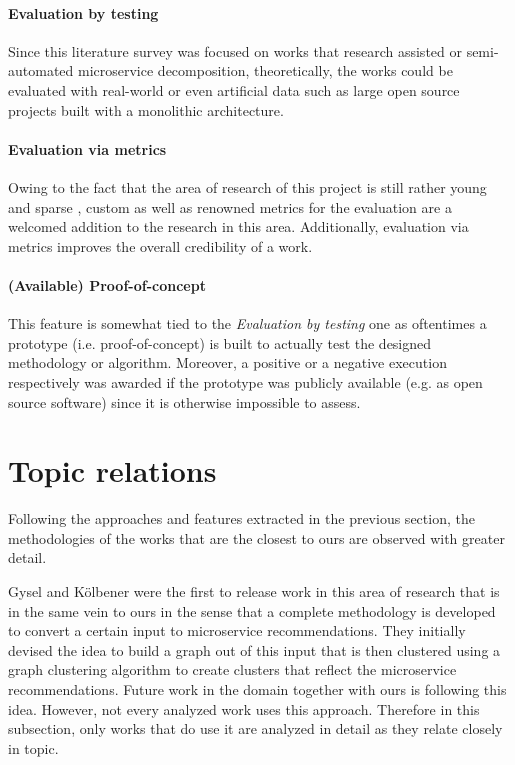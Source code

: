 \documentclass[12pt,a4paper]{report}
\begin{document}
\paragraph{Evaluation by testing}
Since this literature survey was focused on works that research assisted or semi-automated
microservice decomposition, theoretically, the works could be evaluated with real-world or
even artificial data such as large open source projects built with a monolithic architecture.
\paragraph{Evaluation via metrics}
Owing to the fact that the area of research of this project is still rather young and sparse
\cite{jin2018functionality}\cite{fritzsch2018monolith}, custom as well as renowned metrics
for the evaluation are a welcomed addition to the research in this area.
Additionally, evaluation via metrics improves the overall credibility of a work.
\paragraph{(Available) Proof-of-concept}
This feature is somewhat tied to the \textit{Evaluation by testing} one as oftentimes
a prototype (i.e. proof-of-concept) is built to actually test the designed
methodology or algorithm. Moreover, a positive or a negative execution respectively
was awarded if the prototype was publicly available (e.g. as open source software)
since it is otherwise impossible to assess.



\section{Topic relations} \label{subsect:topic-relations}

Following the approaches and features extracted in the previous section,
the methodologies of the works that are the closest to ours are observed with greater detail.

Gysel and K{\"o}lbener \cite{gysel2016service} were the first to release work in
this area of research that is in the same vein to ours in the sense that a
complete methodology is developed to convert a certain input to microservice
recommendations. They initially devised the idea to build a graph out of this
input that is then clustered using a graph clustering algorithm to create clusters
that reflect the microservice recommendations.
Future work in the domain \cite{mazlami2017extraction}\cite{kruidenberg2018monoliths}
together with ours is following this idea.
However, not every analyzed work uses this approach.
Therefore in this subsection, only works that do use it are analyzed in detail
as they relate closely in topic.
\end{document}
